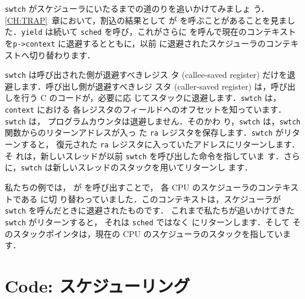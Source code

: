 \lstinline{swtch} がスケジューラにいたるまでの道のりを追いかけてみましょ
う．\ref{CH:TRAP}~章において，割込の結果として  が 
を呼ぶことがあることを見ました．\lstinline{yield} は続いて \lstinline{sched}
を呼び，これがさらに  を呼んで現在のコンテキスト
を\lstinline{p->context} に退避するとともに，以前 
に退避されたスケジューラのコンテキストへ切り替わります．

\lstinline{swtch}
は呼び出された側が退避すべきレジス
タ (callee-saved register) だけを退避します．呼び出し側が退避すべきレジ
スタ (caller-saved register) は，呼び出しを行う C のコードが，必要に応
じてスタックに退避します．\lstinline{swtch} は，\lstinline{context} における
各レジスタのフィールドへのオフセットを知っています．\lstinline{swtch} は，
プログラムカウンタは退避しません．そのかわ
り，\lstinline{swtch} は，\lstinline{swtch} 関数からのリターンアドレスが入っ
た \lstinline{ra} レジスタを保存します．\lstinline{swtch} がリターンすると，
復元された \lstinline{ra} レジスタに入っていたアドレスにリターンします．そ
れは，新しいスレッドが以前 \lstinline{swtch} を呼び出した命令を指していま
す．さらに，\lstinline{swtch} は新しいスレッドのスタックを用いてリターンし
ます．

私たちの例では， が  を呼び出すことで，
各 CPU のスケジューラのコンテキストである  に切
り替わっていました．このコンテキストは，スケジューラが \lstinline{swtch}
を呼んだときに退避されたものです．
これまで私たちが追いかけてきた \lstinline{swtch} がリターンすると，
それは \lstinline{sched} ではなく  にリターンします．そして
そのスタックポインタは，現在の CPU のスケジューラのスタックを指しています．

\section{Code: スケジューリング}

